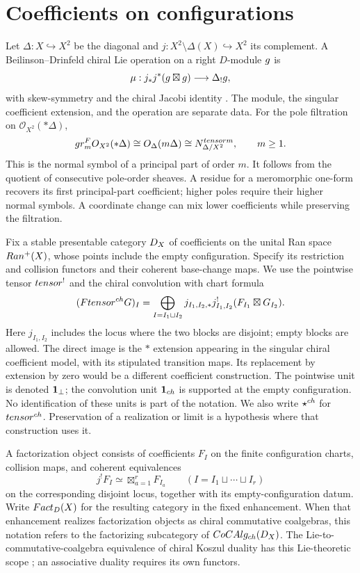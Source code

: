 \section{Coefficients on configurations}
Let $\Delta:X\hookrightarrow X^2$ be the diagonal and
$j:X^2\setminus\Delta(X)\hookrightarrow X^2$ its complement.
A Beilinson--Drinfeld chiral Lie operation on a right $D$-module $\g$ is
\[
 \mu:j_*j^*(\g\boxtimes\g)\longrightarrow\Delta_!\g,
\]
with skew-symmetry and the chiral Jacobi identity \cite{BD04}.
The module, the singular coefficient extension, and the operation are separate data.
For the pole filtration on $\mathcal O_{X^2}(*\Delta)$,
\[
 \gr_m^F\mathcal O_{X^2}(*\Delta)
 \cong\mathcal O_\Delta(m\Delta)
 \cong N_{\Delta/X^2}^{\otimes m},\qquad m\ge1.
\]
This is the normal symbol of a principal part of order $m$.
It follows from the quotient of consecutive pole-order sheaves.
A residue for a meromorphic one-form recovers its first principal-part coefficient;
higher poles require their higher normal symbols. A coordinate change can mix
lower coefficients while preserving the filtration.

Fix a stable presentable category $\Dcal_X$ of coefficients on the unital Ran space
$\Ran^+(X)$, whose points include the empty configuration.
Specify its restriction and collision functors and their coherent base-change maps.
We use the pointwise tensor $\tensor^!$ and the chiral convolution with chart formula
\[
 (F\tensor^{\ch}G)_I
 =\bigoplus_{I=I_1\sqcup I_2}
 j_{I_1,I_2,*}j_{I_1,I_2}^{!}(F_{I_1}\boxtimes G_{I_2}).
\]
Here $j_{I_1,I_2}$ includes the locus where the two blocks are disjoint;
empty blocks are allowed. The direct image is the $*$ extension appearing
in the singular chiral coefficient model, with its stipulated transition maps.
Its replacement by extension by zero would be a different coefficient construction.
The pointwise unit is denoted $\mathbbm1_\perp$; the convolution unit
$\mathbbm1_{\ch}$ is supported at the empty configuration.
No identification of these units is part of the notation.
We also write $\starCh$ for $\tensor^{\ch}$. Preservation of a realization or limit is a hypothesis where that construction uses it.

A factorization object consists of coefficients $F_I$ on the finite configuration
charts, collision maps, and coherent equivalences
\[
 j^!F_I\simeq\mathop{\boxtimes}_{a=1}^r F_{I_a}
 \qquad(I=I_1\sqcup\cdots\sqcup I_r)
\]
on the corresponding disjoint locus, together with its empty-configuration datum.
Write $\Fact_D(X)$ for the resulting category in the fixed enhancement.
When that enhancement realizes factorization objects as chiral commutative
coalgebras, this notation refers to the factorizing subcategory of
$\operatorname{CoCAlg}_{\ch}(\Dcal_X)$.
The Lie-to-commutative-coalgebra equivalence of chiral Koszul duality has this
Lie-theoretic scope \cite{FG12,Heuts}; an associative duality requires its own functors.

